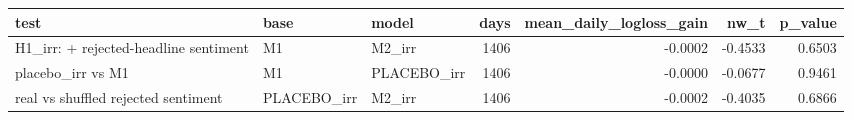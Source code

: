 \begin{tabular}{lllrrrr}
\toprule
test & base & model & days & mean\_daily\_logloss\_gain & nw\_t & p\_value \\
\midrule
H1\_irr: + rejected-headline sentiment & M1 & M2\_irr & 1406 & -0.0002 & -0.4533 & 0.6503 \\
placebo\_irr vs M1 & M1 & PLACEBO\_irr & 1406 & -0.0000 & -0.0677 & 0.9461 \\
real vs shuffled rejected sentiment & PLACEBO\_irr & M2\_irr & 1406 & -0.0002 & -0.4035 & 0.6866 \\
\bottomrule
\end{tabular}
